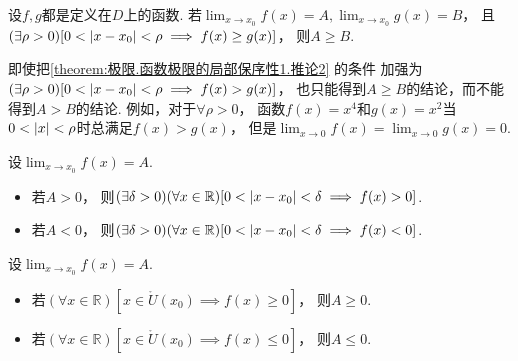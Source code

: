 \begin{corollary}\label{theorem:极限.函数极限的局部保序性1.推论2}
设\(f,g\)都是定义在\(D\)上的函数.
若\(\lim_{x\to x_0} f(x) = A,
\lim_{x\to x_0} g(x) = B\)，
且\((\exists\rho>0)[0<\abs{x-x_0}<\rho \implies f(x) \geq g(x)]\)，
则\(A \geq B\).
\end{corollary}
\begin{remark}
即使把\cref{theorem:极限.函数极限的局部保序性1.推论2} 的条件
加强为\((\exists\rho>0)[0<\abs{x-x_0}<\rho \implies f(x) > g(x)]\)，
也只能得到\(A \geq B\)的结论，而不能得到\(A > B\)的结论.
例如，对于\(\forall\rho>0\)，
函数\(f(x) = x^4\)和\(g(x) = x^2\)当\(0<\abs{x}<\rho\)时总满足\(f(x) > g(x)\)，
但是\(\lim_{x\to0} f(x) = \lim_{x\to0} g(x) = 0\).
\end{remark}


\begin{corollary}[局部保号性]\label{theorem:极限.函数极限的局部保号性1}
设\(\lim_{x \to x_0} f(x) = A\).
\begin{itemize}
	\item 若\(A>0\)，
	则\((\exists\delta>0)
	(\forall x\in\mathbb{R})
	[0<\abs{x-x_0}<\delta \implies f(x)>0]\).
	\item 若\(A<0\)，
	则\((\exists\delta>0)
	(\forall x\in\mathbb{R})
	[0<\abs{x-x_0}<\delta \implies f(x)<0]\).
\end{itemize}
\end{corollary}

\begin{corollary}\label{theorem:极限.函数极限的局部保号性3}
设\(\lim_{x \to x_0} f(x) = A\).
\begin{itemize}
	\item 若\((\forall x\in\mathbb{R})
	[x\in\mathring{U}(x_0) \implies f(x) \geq 0]\)，
	则\(A \geq 0\).
	\item 若\((\forall x\in\mathbb{R})
	[x\in\mathring{U}(x_0) \implies f(x) \leq 0]\)，
	则\(A \leq 0\).
\end{itemize}
\end{corollary}


